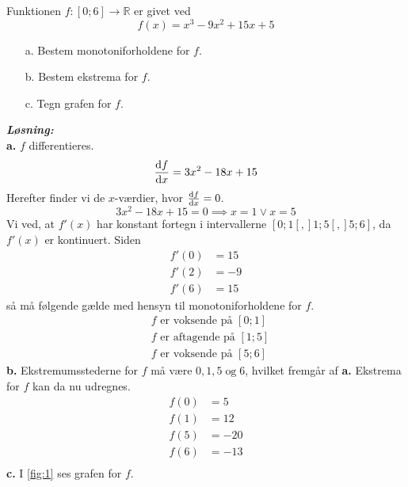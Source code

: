\documentclass{article}
\newcommand{\sol}{\setlength{\parindent}{0cm}\textbf{\textit{Løsning:}}\setlength{\parindent}{1cm}}
\begin{document}
\begin{question}{}{}
  Funktionen $f:[0;6]\to \mathbb{R}$ er givet ved
  \[
  f(x)= x^3 -9x^2 +15x+5
  \] 
  \begin{itemize}
    \item[a.] Bestem monotoniforholdene for $f$.
    \item[b.] Bestem ekstrema for $f$.
    \item[c.] Tegn grafen for $f$.
  \end{itemize}
\end{question}
\sol \\ 
\textbf{a.} $f$ differentieres.
\[
\dv{f}{x}= 3x^2-18x+15 
\] 
Herefter finder vi de $x$-værdier, hvor $\dv{f}{x}=0$.
\begin{equation*}
  3x^2-18x+15=0 \implies x=1 \lor x=5
\end{equation*}
Vi ved, at $f'(x)$ har konstant fortegn i intervallerne $[0;1[, ]1;5[, ]5;6]$, da $f'(x)$ er kontinuert. 
Siden 
\begin{equation*}
\begin{split}
  f'(0)&=15\\
  f'(2)&=-9\\
  f'(6)&=15
\end{split}
\end{equation*}
så må følgende gælde med hensyn til monotoniforholdene for $f$.
\begin{equation*}
\begin{split}
  &f \text{ er voksende på } [0;1]\\
&f \text{ er aftagende på } [1;5]\\
&f \text{ er voksende på } [5;6]
\end{split}
\end{equation*}
\textbf{b.} Ekstremumsstederne for $f$ må være $0,1,5\;\text{og}\;6$, hvilket fremgår af \textbf{a.} 
Ekstrema for $f$ kan da nu udregnes.
\begin{equation*}
\begin{split}
  f(0)&= 5\\
  f(1)&= 12\\
  f(5)&= -20\\
  f(6)&= -13\\
\end{split}
\end{equation*}
\textbf{c.} I \cref{fig:1} ses grafen for $f$.
\end{document}
